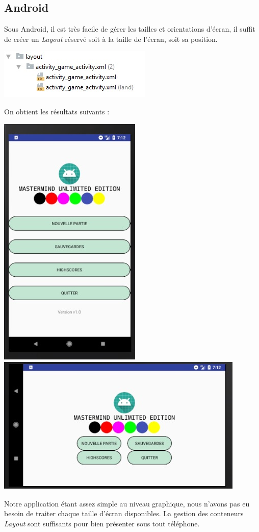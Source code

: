 \documentclass{article}
\begin{document}
\subsection{Android}
Sous Android, il est très facile de gérer les tailles et orientations d'écran, il suffit de créer un \textit{Layout} réservé soit à la taille de l'écran, soit sa position. 
\begin{center}
\includegraphics{layout}
\end{center}
On obtient les résultats suivants :
\begin{center}
\includegraphics[scale = 0.5]{Menu} \includegraphics[scale = 0.5]{Menu_land}
\end{center}
Notre application étant assez simple au niveau graphique, nous n'avons pas eu besoin de traiter chaque taille d'écran disponibles. La gestion des  conteneurs \textit{Layout} sont suffisants pour bien présenter sous tout téléphone.
\end{document}
